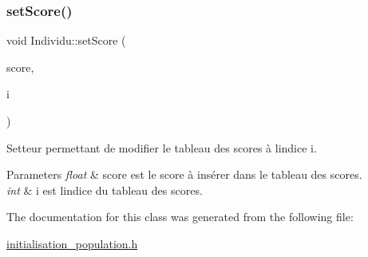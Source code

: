 \subsubsection{\texorpdfstring{set\+Score()}{setScore()}}
{\footnotesize\ttfamily void Individu\+::set\+Score (\begin{DoxyParamCaption}\item[{float}]{score,  }\item[{int}]{i }\end{DoxyParamCaption})}



Setteur permettant de modifier le tableau des scores à l\textquotesingle{}indice i. 


\begin{DoxyParams}{Parameters}
{\em float} & score est le score à insérer dans le tableau des scores. \\
\hline
{\em int} & i est l\textquotesingle{}indice du tableau des scores. \\
\hline
\end{DoxyParams}


The documentation for this class was generated from the following file\+:\begin{DoxyCompactItemize}
\item 
\hyperlink{initialisation__population_8h}{initialisation\+\_\+population.\+h}\end{DoxyCompactItemize}
